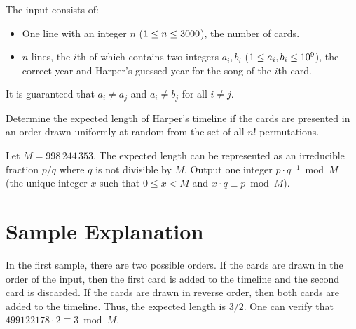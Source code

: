 \begin{Input}
    The input consists of:
    \begin{itemize}
        \item One line with an integer $n$ ($1 \le n \le 3000$), the number of cards.
        \item $n$ lines, the $i$th of which contains two integers $a_i, b_i$ ($1 \le a_i, b_i \le 10^9$), the correct year and Harper's guessed year for the song of the $i$th card.
    \end{itemize}
    It is guaranteed that $a_i \ne a_j$ and $a_i \ne b_j$ for all $i \ne j$.
\end{Input}

\begin{Output}
    Determine the expected length of Harper's timeline if the cards are presented in an order drawn uniformly at random from the set of all $n!$ permutations.

    Let $M = 998\,244\,353$.
    The expected length can be represented as an irreducible fraction $p / q$ where $q$ is not divisible by $M$.
    Output one integer $p \cdot q^{-1} \bmod M$ (the unique integer $x$ such that $0 \le x < M$ and $x \cdot q \equiv p \bmod M$).
\end{Output}

\section*{Sample Explanation}

In the first sample, there are two possible orders.
If the cards are drawn in the order of the input, then the first card is added to the timeline and the second card is discarded.
If the cards are drawn in reverse order, then both cards are added to the timeline.
Thus, the expected length is $3/2$.
One can verify that $499122178 \cdot 2 \equiv 3 \bmod M$.
